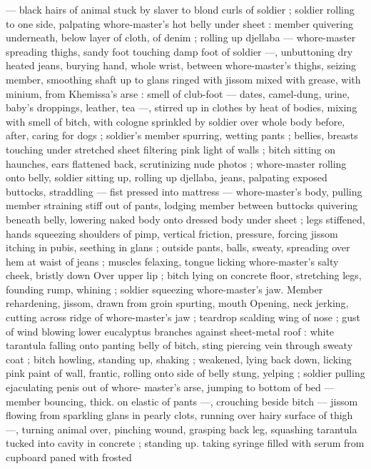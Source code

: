 --- black hairs of animal stuck by slaver to blond curls of soldier ;
soldier rolling to one side, palpating whore-master’s hot belly under
sheet : member quivering underneath, below layer of cloth, of denim
; rolling up djellaba --- whore-master spreading thighs, sandy foot
touching damp foot of soldier ---, unbuttoning dry heated jeans,
burying hand, whole wrist, between whore-master's thighs, seizing
member, smoothing shaft up to glans ringed with jissom mixed with
grease, with minium, from Khemissa’s arse : smell of club-foot ---
dates, camel-dung, urine, baby's droppings, leather, tea ---, stirred
up in clothes by heat of bodies, mixing with smell of bitch, with
cologne sprinkled by soldier over whole body before, after, caring for
dogs ; soldier's member spurring, wetting pants ; bellies, breasts
touching under stretched sheet filtering pink light of walls ; bitch
sitting on haunches, ears flattened back, scrutinizing nude photos ;
whore-master rolling onto belly, soldier sitting up, rolling up djellaba,
jeans, palpating exposed buttocks, straddling --- fist pressed into
mattress --- whore-master's body, pulling member straining stiff out
of pants, lodging member between buttocks quivering beneath belly,
lowering naked body onto dressed body under sheet ; legs stiffened,
hands squeezing shoulders of pimp, vertical friction, pressure,
forcing jissom itching in pubis, seething in glans ; outside pants,
balls, sweaty, spreading over hem at waist of jeans ; muscles
felaxing, tongue licking whore-master's salty cheek, bristly down
Over upper lip ; bitch lying on concrete floor, stretching legs,
founding rump, whining ; soldier squeezing whore-master's jaw.
Member rehardening, jissom, drawn from groin spurting, mouth
Opening, neck jerking, cutting across ridge of whore-master's jaw ;
teardrop scalding wing of nose ; gust of wind blowing lower
eucalyptus branches against sheet-metal roof : white tarantula
falling onto panting belly of bitch, sting piercing vein through sweaty
coat ; bitch howling, standing up, shaking ; weakened, lying back
down, licking pink paint of wall, frantic, rolling onto side of belly
stung, yelping ; soldier pulling ejaculating penis out of whore-
master's arse, jumping to bottom of bed --- member bouncing, thick.
on elastic of pants ---, crouching beside bitch --- jissom flowing from
sparkling glans in pearly clots, running over hairy surface of thigh
---, turning animal over, pinching wound, grasping back leg,
squashing tarantula tucked into cavity in concrete ; standing up.
taking syringe filled with serum from cupboard paned with frosted
